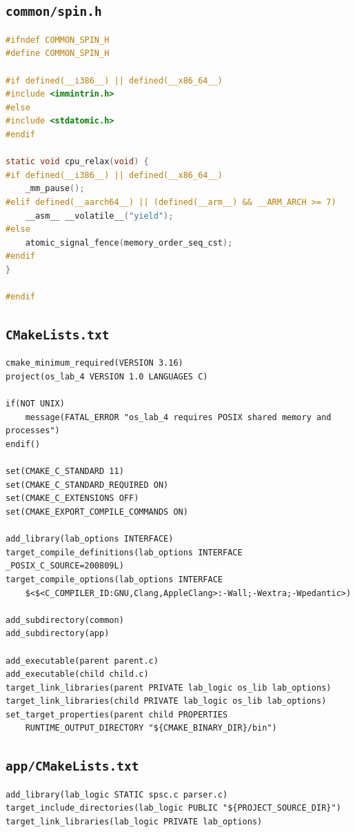 \documentclass[12pt,a4paper,oneside,fleqn]{article}
\begin{document}
\subsection*{\texttt{common/spin.h}}
\begin{lstlisting}[language=C]
#ifndef COMMON_SPIN_H
#define COMMON_SPIN_H

#if defined(__i386__) || defined(__x86_64__)
#include <immintrin.h>
#else
#include <stdatomic.h>
#endif

static void cpu_relax(void) {
#if defined(__i386__) || defined(__x86_64__)
    _mm_pause();
#elif defined(__aarch64__) || (defined(__arm__) && __ARM_ARCH >= 7)
    __asm__ __volatile__("yield");
#else
    atomic_signal_fence(memory_order_seq_cst);
#endif
}

#endif
\end{lstlisting}
\subsection*{\texttt{CMakeLists.txt}}
\begin{lstlisting}[language={}]
cmake_minimum_required(VERSION 3.16)
project(os_lab_4 VERSION 1.0 LANGUAGES C)

if(NOT UNIX)
    message(FATAL_ERROR "os_lab_4 requires POSIX shared memory and processes")
endif()

set(CMAKE_C_STANDARD 11)
set(CMAKE_C_STANDARD_REQUIRED ON)
set(CMAKE_C_EXTENSIONS OFF)
set(CMAKE_EXPORT_COMPILE_COMMANDS ON)

add_library(lab_options INTERFACE)
target_compile_definitions(lab_options INTERFACE _POSIX_C_SOURCE=200809L)
target_compile_options(lab_options INTERFACE
    $<$<C_COMPILER_ID:GNU,Clang,AppleClang>:-Wall;-Wextra;-Wpedantic>)

add_subdirectory(common)
add_subdirectory(app)

add_executable(parent parent.c)
add_executable(child child.c)
target_link_libraries(parent PRIVATE lab_logic os_lib lab_options)
target_link_libraries(child PRIVATE lab_logic os_lib lab_options)
set_target_properties(parent child PROPERTIES
    RUNTIME_OUTPUT_DIRECTORY "${CMAKE_BINARY_DIR}/bin")
\end{lstlisting}
\subsection*{\texttt{app/CMakeLists.txt}}
\begin{lstlisting}[language={}]
add_library(lab_logic STATIC spsc.c parser.c)
target_include_directories(lab_logic PUBLIC "${PROJECT_SOURCE_DIR}")
target_link_libraries(lab_logic PRIVATE lab_options)
\end{lstlisting}
\end{document}
